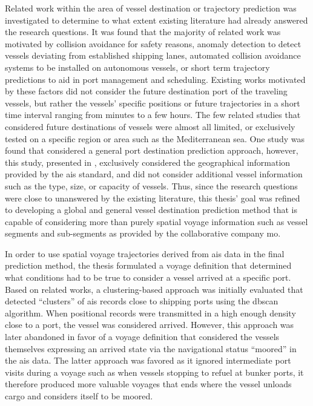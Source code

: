 Related work within the area of vessel destination or trajectory prediction was investigated to determine to what extent existing literature had already answered the research questions. It was found that the majority of related work was motivated by collision avoidance for safety reasons, anomaly detection to detect vessels deviating from established shipping lanes, automated collision avoidance systems to be installed on autonomous vessels, or short term trajectory predictions to aid in port management and scheduling. Existing works motivated by these factors did not consider the future destination port of the traveling vessels, but rather the vessels' specific positions or future trajectories in a short time interval ranging from minutes to a few hours. The few related studies that considered future destinations of vessels were almost all limited, or exclusively tested on a specific region or area such as the Mediterranean sea. One study was found that considered a general port destination prediction approach, however, this study, presented in \cite{Zhang2020AISApproach}, exclusively considered the geographical information provided by the \acrshort{ais} standard, and did not consider additional vessel information such as the type, size, or capacity of vessels. Thus, since the research questions were close to unanswered by the existing literature, this thesis' goal was refined to developing a global and general vessel destination prediction method that is capable of considering more than purely spatial voyage information such as vessel segments and sub-segments as provided by the collaborative company \acrfull{mo}.

In order to use spatial voyage trajectories derived from \acrshort{ais} data in the final prediction method, the thesis formulated a voyage definition that determined what conditions had to be true to consider a vessel arrived at a specific port. Based on related works, a clustering-based approach was initially evaluated that detected ``clusters'' of \acrshort{ais} records close to shipping ports using the \acrfull{dbscan} algorithm. When positional records were transmitted in a high enough density close to a port, the vessel was considered arrived. However, this approach was later abandoned in favor of a voyage definition that considered the vessels themselves expressing an arrived state via the navigational status ``moored'' in the \acrshort{ais} data. The latter approach was favored as it ignored intermediate port visits during a voyage such as when vessels stopping to refuel at bunker ports, it therefore produced more valuable voyages that ends where the vessel unloads cargo and considers itself to be moored.

